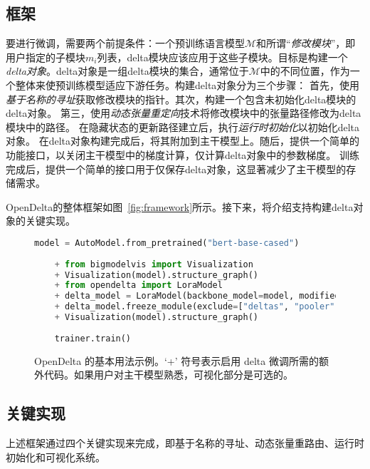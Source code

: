 \subsection{框架}

 要进行微调，需要两个前提条件：一个预训练语言模型$\mathcal{M}$和所谓“\textit{修改模块}”，即用户指定的子模块$m_i$列表，delta模块应该应用于这些子模块。目标是构建一个\textit{delta对象}。delta对象是一组delta模块的集合，通常位于$\mathcal{M}$中的不同位置，作为一个整体来使预训练模型适应下游任务。构建delta对象分为三个步骤：
首先，使用\textit{基于名称的寻址}获取修改模块的指针。其次，构建一个包含未初始化delta模块的delta对象。
第三，使用\textit{动态张量重定向}技术将修改模块中的张量路径修改为delta模块中的路径。
在隐藏状态的更新路径建立后，执行\textit{运行时初始化}以初始化delta对象。
 在delta对象构建完成后，将其附加到主干模型上。随后，提供一个简单的功能接口，以关闭主干模型中的梯度计算，仅计算delta对象中的参数梯度。
训练完成后，提供一个简单的接口用于仅保存delta对象，这显著减少了主干模型的存储需求。

 OpenDelta的整体框架如图~\ref{fig:framework}所示。接下来，将介绍支持构建delta对象的关键实现。


\begin{figure}
    \hspace{3mm}
    \centering
    \begin{minipage}{0.96\textwidth}
    \begin{lstlisting}[language=Python]
    model = AutoModel.from_pretrained("bert-base-cased")
    
    + from bigmodelvis import Visualization
    + Visualization(model).structure_graph()
    + from opendelta import LoraModel
    + delta_model = LoraModel(backbone_model=model, modified_modules=["output.dense", "query"])
    + delta_model.freeze_module(exclude=["deltas", "pooler"], set_state_dict=True)
    + Visualization(model).structure_graph()
    
    trainer.train()
    \end{lstlisting}
    \end{minipage} 
    \caption{OpenDelta 的基本用法示例。`+' 符号表示启用 delta 微调所需的额外代码。如果用户对主干模型熟悉，可视化部分是可选的。}
    \label{fig:basic_usage} 
\end{figure}


\subsection{关键实现}
上述框架通过四个关键实现来完成，即基于名称的寻址、动态张量重路由、运行时初始化和可视化系统。

